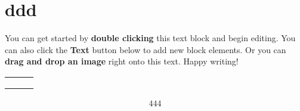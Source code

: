\section{ddd}


You can get started by \textbf{double clicking} this text block and begin editing. You can also click the \textbf{Text} button below to add new block elements. Or you can \textbf{drag and drop an image} right onto this text. Happy writing!
\begin{table} 
    \begin{tabular}{ c c c }
         &  &  \\ 
         &  &  \\ 
         &  &  \\ 
    \end{tabular} 
\end{table}

\begin{align}
444
\end{align}